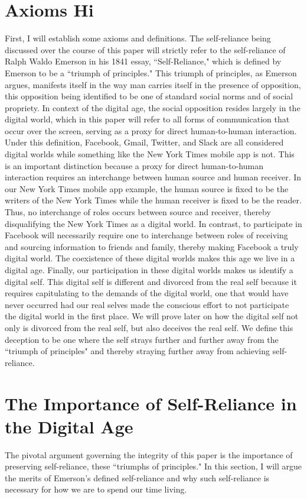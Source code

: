 \documentclass[12pt,letterpaper]{article}
\begin{document}
\section{Axioms Hi}
First, I will establish some axioms and definitions.  The self-reliance being 
discussed over the course of this paper will strictly refer to the self-reliance of 
Ralph Waldo Emerson in his 1841 essay, ``Self-Reliance," which is defined by 
Emerson to be a ``triumph of principles."  This triumph of principles, as 
Emerson argues, manifests itself in the way man carries itself in the presence 
of opposition, this opposition being identified to be one of standard social 
norms and of social propriety.  In context of the digital age, the social opposition 
resides largely in the digital world, which in this paper will refer to all forms of 
communication that occur over the screen, serving as a proxy for direct 
human-to-human interaction.  Under this definition, Facebook, Gmail, 
Twitter, and Slack are all considered digital worlds while something like the 
New York Times mobile app is not.  This is an important distinction because a 
proxy for direct human-to-human interaction requires an interchange between 
human source and human receiver.  In our New York Times mobile app 
example, the human source is fixed to be the writers of the New York Times 
while the human receiver is fixed to be the reader.  Thus, no interchange of 
roles occurs between source and receiver, thereby disqualifying the New York 
Times as a digital world.  In contrast, to participate in Facebook will 
necessarily require one to interchange between roles of receiving and sourcing 
information to friends and family, thereby making Facebook a truly digital 
world.  The coexistence of these digital worlds makes this age we live in a 
digital age.  Finally, our participation in these digital worlds makes us identify a digital self.  This digital self is different and divorced from the real self because it requires capitulating to the demands of the digital world, one that would have never occurred had our real selves made the conscious effort to not participate the digital world in the first place.  We will prove later on how the digital self not only is divorced from the real self, but also deceives the real self.  We define this deception to be one where the self strays further and further away from the ``triumph of principles" and thereby straying further away from achieving self-reliance.

\section{The Importance of Self-Reliance in the Digital Age}
The pivotal argument governing the integrity of this paper is the importance of preserving self-reliance, these ``triumphs of principles."  In this section, I will argue the merits of Emerson's defined self-reliance and why such self-reliance is necessary for how we are to spend our time living.
\end{document}
